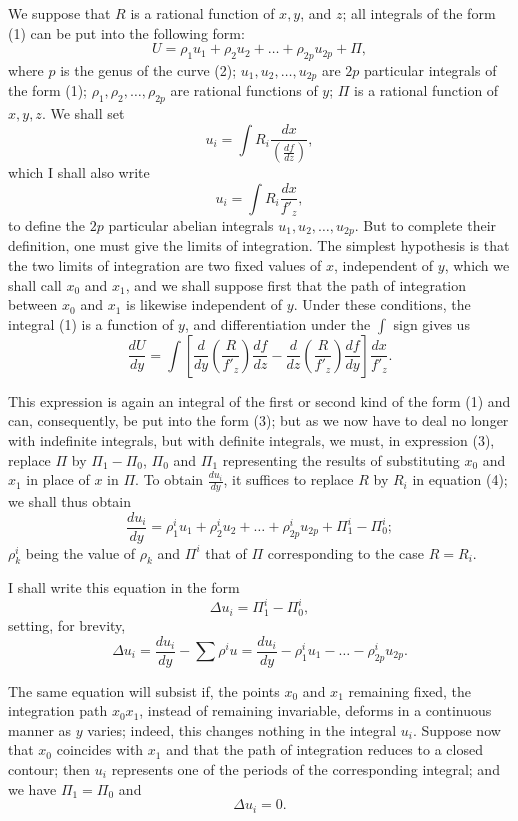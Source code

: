 \documentclass{article}
\begin{document}
We suppose that $R$ is a rational function of $x, y$, and $z$; all integrals of the form (1) can be put into the following form:
\[
U = \rho_{1} u_{1} + \rho_{2} u_{2} + \ldots + \rho_{2p} u_{2p} + \Pi, \tag{3}
\]
where $p$ is the genus of the curve (2); $u_{1}, u_{2}, \ldots, u_{2p}$ are $2p$ particular integrals of the form (1); $\rho_{1}, \rho_{2}, \ldots, \rho_{2p}$ are rational functions of $y$; $\Pi$ is a rational function of $x, y, z$. We shall set
\[
u_{i} = \int R_{i} \frac{dx}{\left(\frac{df}{dz}\right)},
\]
which I shall also write
\[
u_{i} = \int R_{i} \frac{dx}{f'_{z}},
\]
to define the $2p$ particular abelian integrals $u_{1}, u_{2}, \ldots, u_{2p}$. But to complete their definition, one must give the limits of integration. The simplest hypothesis is that the two limits of integration are two fixed values of $x$, independent of $y$, which we shall call $x_{0}$ and $x_{1}$, and we shall suppose first that the path of integration between $x_{0}$ and $x_{1}$ is likewise independent of $y$. Under these conditions, the integral (1) is a function of $y$, and differentiation
under the $\displaystyle\int$ sign gives us
\[
\frac{dU}{dy} = \int \left[ \frac{d}{dy}\left(\frac{R}{f'_{z}}\right)\frac{df}{dz} - \frac{d}{dz}\left(\frac{R}{f'_{z}}\right)\frac{df}{dy} \right] \frac{dx}{f'_{z}}. \tag{4}
\]

This expression is again an integral of the first or second kind of the form (1) and can, consequently, be put into the form (3); but as we now have to deal no longer with indefinite integrals, but with definite integrals, we must, in expression (3), replace $\Pi$ by $\Pi_{1} - \Pi_{0}$, $\Pi_{0}$ and $\Pi_{1}$ representing the results of substituting $x_{0}$ and $x_{1}$ in place of $x$ in $\Pi$. To obtain $\displaystyle\frac{du_{i}}{dy}$, it suffices to replace $R$ by $R_{i}$ in equation (4); we shall thus obtain
\[
\frac{du_{i}}{dy} = \rho_{1}^{i} u_{1} + \rho_{2}^{i} u_{2} + \ldots + \rho_{2p}^{i} u_{2p} + \Pi_{1}^{i} - \Pi_{0}^{i}; \tag{5}
\]
$\rho_{k}^{i}$ being the value of $\rho_{k}$ and $\Pi^{i}$ that of $\Pi$ corresponding to the case $R = R_{i}$.

I shall write this equation in the form
\[
\Delta u_{i} = \Pi_{1}^{i} - \Pi_{0}^{i}, \tag{5 a}
\]
setting, for brevity,
\[
\Delta u_{i} = \frac{du_{i}}{dy} - \sum \rho^{i} u = \frac{du_{i}}{dy} - \rho_{1}^{i} u_{1} - \ldots - \rho_{2p}^{i} u_{2p}.
\]

The same equation will subsist if, the points $x_{0}$ and $x_{1}$ remaining fixed, the integration path $x_{0}x_{1}$, instead of remaining invariable, deforms in a continuous manner as $y$ varies; indeed, this changes nothing in the integral $u_{i}$. Suppose now that $x_{0}$ coincides with $x_{1}$ and that the path of integration reduces to a closed contour; then $u_{i}$ represents one of the periods of the corresponding integral; and we have $\Pi_{1} = \Pi_{0}$ and
\[
\Delta u_{i} = 0. \tag{5 b}
\]
\end{document}
